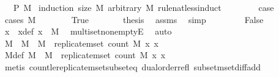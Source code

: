 \begin{isabellebody}
\ \ \ {\isachardoublequoteopen}P\ M{\isachardoublequoteclose}\isanewline
%
\isadelimproof
%
\endisadelimproof
%
\isatagproof
{}\isamarkupfalse%
\ {\isacharparenleft}{\kern0pt}induction\ {\isachardoublequoteopen}size\ M{\isachardoublequoteclose}\ arbitrary{\isacharcolon}{\kern0pt}\ M\ rule{\isacharcolon}{\kern0pt}nat{\isacharunderscore}{\kern0pt}less{\isacharunderscore}{\kern0pt}induct{\isacharparenright}{\kern0pt}\isanewline
\ \ \isamarkupfalse%
\ {}\isanewline
\ \ \isamarkupfalse%
\ {\isacharquery}{\kern0pt}case\isanewline
\ \ \isamarkupfalse%
\ {\isacharparenleft}{\kern0pt}cases\ {\isachardoublequoteopen}M\ {\isacharequal}{\kern0pt}\ {\isacharbraceleft}{\kern0pt}{\isacharhash}{\kern0pt}{\isacharbraceright}{\kern0pt}{\isachardoublequoteclose}{\isacharparenright}{\kern0pt}\isanewline
\ \ \ \ \isamarkupfalse%
\ True\isanewline
\ \ \ \ \isamarkupfalse%
\ \isamarkupfalse%
\ {\isacharquery}{\kern0pt}thesis\ \isamarkupfalse%
\ assms\ \isamarkupfalse%
\ simp\isanewline
\ \ \isamarkupfalse%
\isanewline
\ \ \ \ \isamarkupfalse%
\ False\isanewline
\ \ \ \ \isamarkupfalse%
\ \isamarkupfalse%
\ x\ \ x{\isacharunderscore}{\kern0pt}def{\isacharcolon}{\kern0pt}\ {\isachardoublequoteopen}x\ {\isasymin}{\isacharhash}{\kern0pt}\ M{\isachardoublequoteclose}\ \isamarkupfalse%
\ multiset{\isacharunderscore}{\kern0pt}nonemptyE\ \isamarkupfalse%
\ auto\isanewline
\ \ \ \ \isamarkupfalse%
\ M{}\ \ {\isachardoublequoteopen}M{}\ {\isacharequal}{\kern0pt}\ M\ {\isacharminus}{\kern0pt}\ replicate{\isacharunderscore}{\kern0pt}mset\ {\isacharparenleft}{\kern0pt}count\ M\ x{\isacharparenright}{\kern0pt}\ x{\isachardoublequoteclose}\isanewline
\ \ \ \ \isamarkupfalse%
\ \isamarkupfalse%
\ M{\isacharunderscore}{\kern0pt}def{\isacharcolon}{\kern0pt}\ {\isachardoublequoteopen}M\ {\isacharequal}{\kern0pt}\ M{}\ {\isacharplus}{\kern0pt}\ replicate{\isacharunderscore}{\kern0pt}mset\ {\isacharparenleft}{\kern0pt}count\ M\ x{\isacharparenright}{\kern0pt}\ x{\isachardoublequoteclose}\isanewline
\ \ \ \ \ \ \isamarkupfalse%
\ {\isacharparenleft}{\kern0pt}metis\ count{\isacharunderscore}{\kern0pt}le{\isacharunderscore}{\kern0pt}replicate{\isacharunderscore}{\kern0pt}mset{\isacharunderscore}{\kern0pt}subset{\isacharunderscore}{\kern0pt}eq\ dual{\isacharunderscore}{\kern0pt}order{\isachardot}{\kern0pt}refl\ subset{\isacharunderscore}{\kern0pt}mset{\isachardot}{\kern0pt}diff{\isacharunderscore}{\kern0pt}add{\isacharparenright}{\kern0pt}\isanewline

\end{isabellebody}
